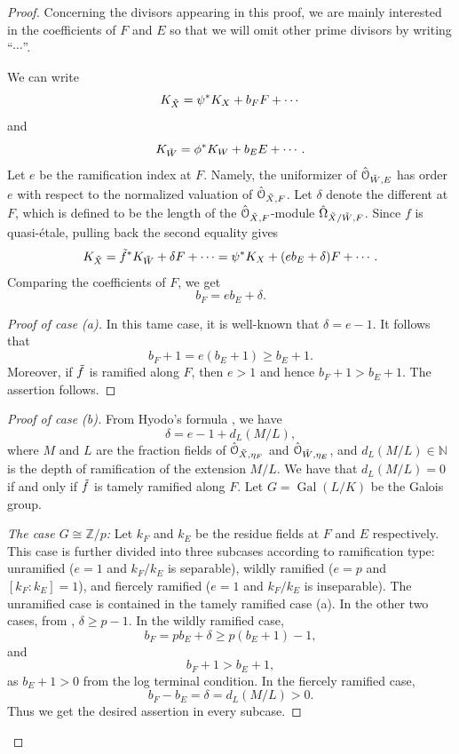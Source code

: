 \documentclass[12pt]{amsart}
\theoremstyle{plain}   %
\theoremstyle{definition}    %
\theoremstyle{remark}    %
\numberwithin{equation}{theorem}
\DeclareMathOperator{\Gal}{{Gal}}
\newcommand{\sO}{\mathcal{O}}
\newcommand{\bN}{\mathbb{N}}
\newcommand{\bZ}{\mathbb{Z}}
\begin{document}
\begin{proof}
Concerning the divisors appearing in this proof, we are mainly interested in the coefficients of $F$ and $E$ so that we will omit other prime divisors by writing ``$\cdots$''. 

We can write 
\[
K_{\Tilde{X}}= \psi^* K_X + b_F F + \cdots
\]
and 
\[
K_{\Tilde{W}}= \phi^* K_W + b_E E + \cdots.
\]
Let $e$ be the ramification index at $F$. Namely, the uniformizer of $\Hat{\sO}_{\Tilde{W},E}$ has order $e$ with respect to the normalized valuation of $\Hat{\sO}_{\Tilde{X},F}$. Let $\delta$ denote the different at $F$, which is defined to be the length of the $\Hat{\sO}_{\Tilde{X},F}$-module $\hat{\Omega}_{\Tilde{X}/\Tilde{W},F}$. 
Since $f$ is quasi-\'etale, pulling back the second equality gives
\[
K_{\Tilde{X}} = \Tilde{f}^*K_{\Tilde{W}} + \delta F+\cdots 
= \psi ^* K_X + (eb_E+\delta) F+\cdots.
\]
 Comparing the coefficients of $F$, we get
\[
b_F = eb_E + \delta. 
\]

\begin{proof}[Proof of case (a)]
In this tame case, it is well-known that $\delta=e-1$. It follows that 
\[
b_F+1=e(b_E+1) \ge b_E +1. 
\]
Moreover, if $\Tilde{f}$ is ramified along $F$, then $e>1$ and hence $b_F+1 > b_E +1$. The assertion follows.
\end{proof}

\begin{proof}[Proof of case (b)]
From Hyodo's formula \cite[(1-4)]{HyodoWildImperfect}, we have
\[
\delta = e -1 + d_L(M/L),
\]
where $M$ and $L$ are the fraction fields of $\Hat{\sO}_{\Tilde{X},\eta_F}$ and $\Hat{\sO}_{\Tilde{W},\eta_E}$, and $d_L(M/L) \in \bN$ is the depth of ramification of the extension $M/L$. We have that $d_L(M/L)=0$ if and only if $\Tilde{f}$ is tamely ramified along $F$. Let $G=\Gal(L/K)$ be the Galois group.

 \emph{The case $G\cong \bZ/p$:} Let $k_F$ and $k_E$ be the residue fields at $F$ and $E$ respectively. This case is further divided into three subcases according to ramification type: unramified ($e=1$ and $k_F/k_E$ is separable), wildly ramified ($e=p$ and $[k_F:k_E]=1$), and fiercely ramified ($e=1$ and $k_F/k_E$ is inseparable). The unramified case is contained in the tamely ramified case (a).
 In the other two cases, from \cite[Section 2.1]{XiaoZhukovRamifLocalFields}, $\delta \ge p-1$.
 In the wildly ramified case, 
 \[
b_F = pb_E +\delta \ge 
p(b_E+1)-1,
 \]
 and
 \[
 b_F+1 > b_E+1,
 \]
as $b_E+1>0$ from the log terminal condition. In the fiercely ramified case, 
 \[
 b_F-b_E = \delta =d_L(M/L)>0. 
 \]
 Thus we get the desired assertion in every subcase.
 

\end{proof}
\end{proof}
\end{document}
